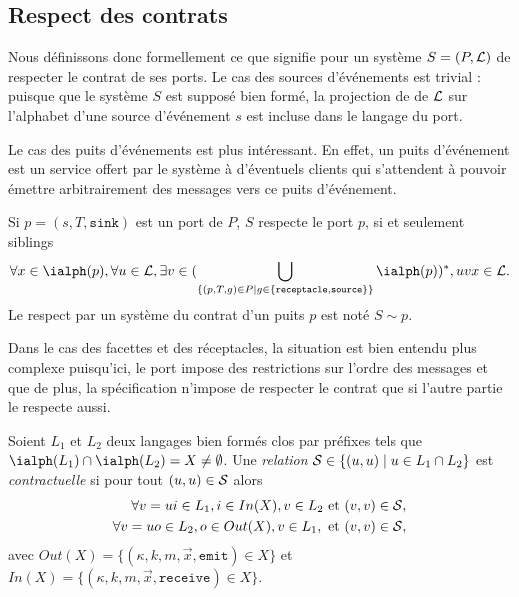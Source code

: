 \subsection{Respect des contrats}

Nous d\'efinissons donc formellement ce que signifie pour un syst\`eme
$S=(P,{\cal L})$ de respecter le contrat de ses ports. Le cas des
sources d'\'ev\'enements est trivial : puisque que le syst\`eme $S$
est suppos\'e bien form\'e, la projection de de $\cal L$ sur
l'alphabet d'une source d'\'ev\'enement $s$ est incluse dans le
langage du port. 

Le cas des puits d'\'ev\'enements est plus int\'eressant. En
effet, un puits d'\'ev\'enement est un service offert par le
syst\`eme \`a d'\'eventuels clients qui s'attendent \`a pouvoir
\'emettre arbitrairement des messages vers ce puits
d'\'ev\'enement.

\begin{definition}
    \label{def:contrat-async}
    Si $p=(s,T,\mathtt{sink})$ est un port de $P$, $S$ respecte le
    port $p$, si et seulement siblings 
    $$
    \forall x\in \ialph(p), \forall u\in {\cal L},\exists v \in
    (\bigcup_{\{(p,T,g)\in P\mid g\in\{\mathtt{receptacle},\mathtt{source}\}\}}\ialph(p))^*, uvx\in {\cal L}.
    $$
    Le respect par un syst\`eme  du contrat d'un puits $p$ est
    not\'e $S \sim p$.
\end{definition}

Dans le cas des facettes et  des r\'eceptacles, la situation est bien
entendu plus complexe puisqu'ici, le port impose des restrictions
sur l'ordre des messages et que de plus, la sp\'ecification n'impose
de respecter le contrat que si l'autre partie le respecte aussi.

\begin{definition}
    \label{def:rel-contrat}
    Soient $L_1$ et $L_2$ deux langages bien form\'es clos par
    pr\'efixes  tels que $\ialph(L_1) \cap \ialph(L_2) = X \neq \emptyset$.  
    Une \emph{relation} ${\cal
    S} \in \{(u,u)\mid u \in L_1\cap L_2\}$  est \emph{contractuelle} si pour tout 
 $(u,u)\in {\cal S}$ alors 
    \begin{eqnarray}
        \label{eq:bsiminput}
        \forall v=ui\in L_1,  i \in  In(X), v\in
        L_2 \mbox{~et~} (v,v)\in {\cal S},\\ 
        \label{eq:bsimoutput}
        \forall v=uo\in L_2, o\in Out(X),
        v\in L_1, \mbox{~et~} (v,v)\in {\cal S},
    \end{eqnarray}
    avec $Out(X) = \{(\kappa,k,m,\vec{x},\mathtt{emit}) \in
    X\}$ et $In(X) =\{(\kappa,k,m,\vec{x},\mathtt{receive})\in
    X\}$. 
\end{definition}

